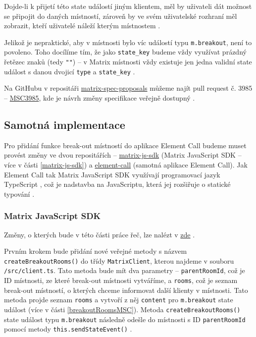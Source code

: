 Dojde-li k přijetí této state událostí jiným klientem, měl by uživateli dát
možnost se připojit do daných místností, zároveň by ve svém uživatelské rozhraní
měl zobrazit, kteří uživatelé náleží kterým místnostem \cite{GitHub-MSC3985}.

Jelikož je nepraktické, aby v místnosti bylo víc událostí typu
\texttt{m.breakout}, není to povoleno. Toho docílíme tím, že jako
\texttt{state_key} budeme vždy využívat prázdný řetězec znaků (tedy
\texttt{""}) \cite{GitHub-MSC3985} -- v Matrix místnosti vždy existuje
jen jedna validní state událost s danou dvojicí \texttt{type} a
\texttt{state_key} \cite{MatrixORG-Spec}.

Na GitHubu v repositáři
\href{https://github.com/matrix-org/matrix-spec-proposals}{matrix-spec-proposals}
můžeme najít pull request č. 3985 --
\href{https://github.com/matrix-org/matrix-spec-proposals/pull/3985}{MSC3985},
kde je návrh změny specifikace veřejně dostupný \cite{GitHub-MSC3985}.

\subsection{Samotná implementace}

Pro přidání funkce break-out místností do aplikace Element Call budeme muset
provést změny ve dvou repositářích --
\href{https://github.com/matrix-org/matrix-js-sdk/}{matrix-js-sdk} (Matrix
JavaScript SDK -- více v části \ref{matrix-js-sdk}) a
\href{https://github.com/vector-im/element-call/}{element-call} (samotná
aplikace Element Call). Jak Element Call tak Matrix JavaScript SDK využívají
programovací jazyk TypeScript \cite{GitHub-MatrixJSSDK, GitHub-ElementCall}, což
je nadstavba na JavaScriptu, která jej rozšiřuje o statické typování
\cite{TypeScript-Homepage}.

\subsubsection{Matrix JavaScript SDK}

Změny, o kterých bude v této části práce řeč, lze nalézt v
\href{https://github.com/matrix-org/matrix-js-sdk/pull/3753/}{zde}
\cite{GitHub-MatrixJSSDK-BreakoutRooms}.

Prvním krokem bude přidání nové veřejné metody s názvem
\texttt{createBreakoutRooms()} do třídy
\texttt{MatrixClient}, kterou najdeme v souboru
\texttt{/src/client.ts}. Tato metoda bude mít dva parametry --
\texttt{parentRoomId}, což je ID místnosti, ze které break-out
místnosti vytváříme, a \texttt{rooms}, což je seznam break-out
místností, o kterých chceme informovat další klienty v místnosti. Tato metoda
projde seznam \texttt{rooms} a vytvoří z něj
\texttt{content} pro \texttt{m.breakout} state událost (více
v části \ref{breakoutRoomsMSC}). Metoda
\texttt{createBreakoutRooms()} state událost typu
\texttt{m.breakout} následně odešle do místnosti s ID
\texttt{parentRoomId} pomocí metody
\texttt{this.sendStateEvent()}
\cite{GitHub-MatrixJSSDK-BreakoutRooms}.

